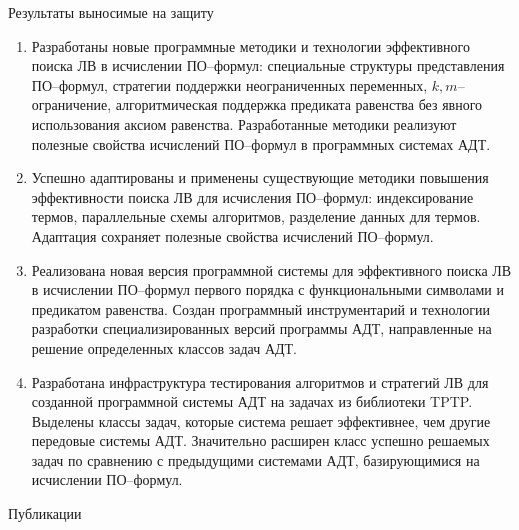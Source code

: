 \documentclass{beamer}
\begin{document}
\begin{frame}{Результаты выносимые на защиту}
\begin{enumerate}
\item Разработаны новые программные методики и технологии эффективного поиска ЛВ в исчислении ПО--формул: специальные структуры представления ПО--формул, стратегии поддержки неограниченных переменных, $k,m$--огра\-ни\-че\-ние, алгоритмическая поддержка предиката равенства без явного использования аксиом равенства. Разработанные методики реализуют полезные свойства исчислений ПО--формул в программных системах АДТ.

\item Успешно адаптированы и применены существующие методики повышения эффективности поиска ЛВ для исчисления ПО--формул: индексирование термов, параллельные схемы алгоритмов, разделение данных для термов. Адаптация сохраняет полезные свойства исчислений ПО--формул.

\item Реализована новая версия программной системы для эффективного поиска ЛВ в исчислении ПО--формул первого порядка с функциональными символами и предикатом равенства. Создан программный инструментарий и технологии разработки специализированных версий программы АДТ, направленные на решение определенных классов задач АДТ. %

\item Разработана инфраструктура тестирования алгоритмов и стратегий ЛВ для созданной программной системы АДТ на задачах из библиотеки TPTP. Выделены классы задач, которые система решает эффективнее, чем другие передовые системы АДТ. Значительно расширен класс успешно решаемых задач по сравнению с предыдущими системами АДТ, базирующимися на исчислении ПО--формул.
\end{enumerate}
\end{frame}


\begin{frame}{Публикации}

\end{frame}
\end{document}

